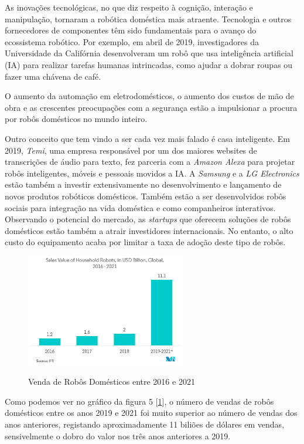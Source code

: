 \documentclass[10pt]{article}
\begin{document}
As inovações tecnológicas, no que diz respeito à cognição, interação e manipulação, tornaram a robótica doméstica mais atraente. Tecnologia e outros fornecedores de componentes têm sido fundamentais para o avanço do ecossistema robótico. Por exemplo, em abril de 2019, investigadores da Universidade da Califórnia desenvolveram um robô que usa inteligência artificial (IA) para realizar tarefas humanas intrincadas, como ajudar a dobrar roupas ou fazer uma chávena de café. 

O aumento da automação em eletrodomésticos, o aumento dos custos de mão de obra e as crescentes preocupações com a segurança estão a impulsionar a procura por robôs domésticos no mundo inteiro. 

Outro conceito que tem vindo a ser cada vez mais falado é casa inteligente. Em 2019, \emph{Temi}, uma empresa responsável por um dos maiores websites de transcrições de áudio para texto, fez parceria com a \emph{Amazon Alexa} para projetar robôs inteligentes, móveis e pessoais movidos a IA. A \emph{Samsung} e a \emph{LG Electronics} estão também a investir extensivamente no desenvolvimento e lançamento de novos produtos robóticos domésticos. Também estão a ser desenvolvidos robôs sociais para integração na vida doméstica e como companheiros interativos. Observando o potencial do mercado, as \emph{startups} que oferecem soluções de robôs domésticos estão também a atrair investidores internacionais. No entanto, o alto custo do equipamento acaba por limitar a taxa de adoção deste tipo de robôs.

\newpage

\begin{figure}[h]
\centering
\includegraphics[width = 7cm]{img/grafico-domesticos.png}
\label{Venda de robôs domésticos}
\caption{Venda de Robôs Domésticos entre 2016 e 2021}
\end{figure}

Como podemos ver no gráfico da figura 5 [\ref{Venda de robôs domésticos}], o número de vendas de robôs domésticos entre os anos 2019 e 2021 foi muito superior ao número de vendas dos anos anteriores, registando aproximadamente 11 biliões de dólares em vendas, sensivelmente o dobro do valor nos três anos anteriores a 2019.
\end{document}
